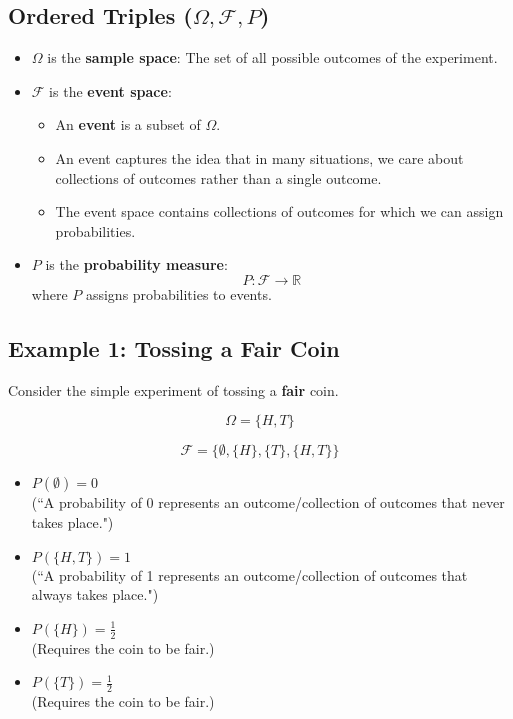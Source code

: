 \documentclass{article}
\begin{document}
\subsection*{Ordered Triples (\(\Omega, \mathcal{F}, P\))}
\begin{itemize}
    \item \(\Omega\) is the \textbf{sample space}: The set of all possible outcomes of the experiment.
    \item \(\mathcal{F}\) is the \textbf{event space}:
    \begin{itemize}
        \item An \textbf{event} is a subset of \(\Omega\).
        \item An event captures the idea that in many situations, we care about collections of outcomes rather than a single outcome.
        \item The event space contains collections of outcomes for which we can assign probabilities.
    \end{itemize}
    \item \(P\) is the \textbf{probability measure}:
    \[
    P: \mathcal{F} \rightarrow \mathbb{R}
    \]
    where \(P\) assigns probabilities to events.

\end{itemize}

\pagebreak

\subsection*{Example 1: Tossing a Fair Coin}
Consider the simple experiment of tossing a \textbf{fair} coin.

\[
\Omega = \{H, T\}
\]

\[
\mathcal{F} = \{\emptyset, \{H\}, \{T\}, \{H, T\}\}
\]

\begin{itemize}
    \item \(P(\emptyset) = 0\) \\
    (``A probability of 0 represents an outcome/collection of outcomes that never takes place.")
    
    \item \(P(\{H, T\}) = 1\) \\
    (``A probability of 1 represents an outcome/collection of outcomes that always takes place.")
    
    \item \(P(\{H\}) = \frac{1}{2}\) \\
    (Requires the coin to be fair.)
    
    \item \(P(\{T\}) = \frac{1}{2}\) \\
    (Requires the coin to be fair.)
\end{itemize}
\end{document}
